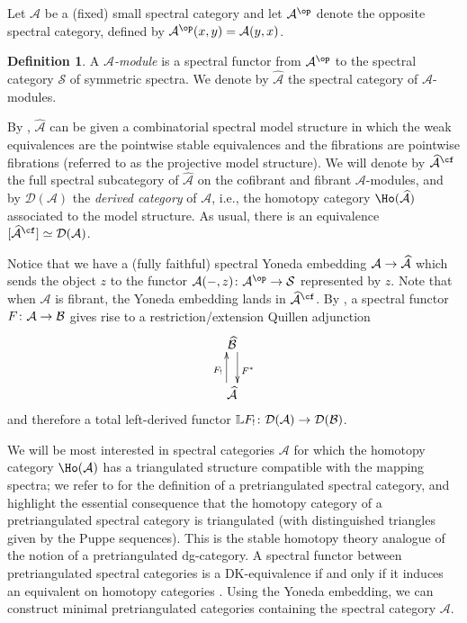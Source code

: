 \documentclass{amsart}
\renewcommand{\to}{\mathchoice{\longrightarrow}{\rightarrow}{\rightarrow}{\rightarrow}}
\newcommand{\cA}{{\mathcal A}}
\newcommand{\cB}{{\mathcal B}}
\newcommand{\cD}{{\mathcal D}}
\let\catsymbfont\mathcal
\newcommand{\aA}{{\catsymbfont{A}}}
\newcommand{\bL}{\mathbb{L}}
\newcommand{\Spt}{\mathcal{S}}%
\numberwithin{equation}{section}
\theoremstyle{definition}
\newtheorem{definition}[equation]{Definition}
\begin{document}
Let $\cA$ be a (fixed) small spectral category and let $\cA^{\op}$ denote the
opposite spectral category, defined by $\cA^{\op}(x,y)=\cA(y,x)$.

\begin{definition}
A {\em $\cA$-module} is a spectral functor from $\cA^{\op}$ to the
spectral category $\Spt$ of symmetric spectra.  We denote by
$\widehat{\aA}$ the spectral category of $\cA$-modules.
\end{definition}

By \cite[A.1.1]{SS}, $\widehat{\aA}$ can be given a
combinatorial spectral model structure in which the weak equivalences
are the pointwise stable equivalences and the
fibrations are pointwise fibrations (referred to as the projective
model structure).  We will denote by $\widehat{\aA}^{\cf}$ the full
spectral subcategory of $\widehat{\cA}$ on the cofibrant and fibrant
$\cA$-modules, and by $\cD(\cA)$ the {\em derived category} of $\cA$,
i.e., the homotopy category $\Ho(\widehat{\cA})$ associated to the
model structure.  As usual, there is an equivalence
$[\widehat{\aA}^{\cf}]\simeq\cD(\cA)$.

Notice that we have a (fully faithful) spectral Yoneda embedding
$\cA \to \widehat{\cA}$ which sends the object $z$ to the functor
$\cA(-,z)\colon\cA^{\op}\to\Spt$ represented by $z$.  Note that when $\cA$ is
fibrant, the Yoneda embedding lands in $\widehat{\aA}^{\cf}$.
By \cite[\S A.1]{SS}, a spectral functor $F\colon\cA \to \cB$ gives rise to
a restriction/extension Quillen adjunction
\[
\xymatrix{
\widehat{\cB} \ar@<1ex>[d]^{F^{\ast}} \\
 \widehat{\cA} \ar@<1ex>[u]^{F_!}
}
\]
and therefore a total left-derived functor $\bL
F_! \colon \cD(\cA)\to\cD(\cB)$.

We will be most interested in spectral categories $\cA$ for which the
homotopy category $\Ho(\cA)$ has a triangulated structure compatible
with the mapping spectra; we refer to \cite[4.4]{BM} for the
definition of a pretriangulated spectral category, and highlight the
essential consequence \cite[4.6]{BM} that the homotopy category of a
pretriangulated spectral category is triangulated (with distinguished
triangles given by the Puppe sequences).  This is the stable homotopy
theory analogue of the notion of a pretriangulated dg-category.  A
spectral functor between pretriangulated spectral categories is a
DK-equivalence if and only if it induces an equivalent on homotopy
categories \cite[5.7]{BM2}.  Using the Yoneda embedding, we can
construct minimal pretriangulated categories containing the
spectral category $\aA$.
\end{document}
